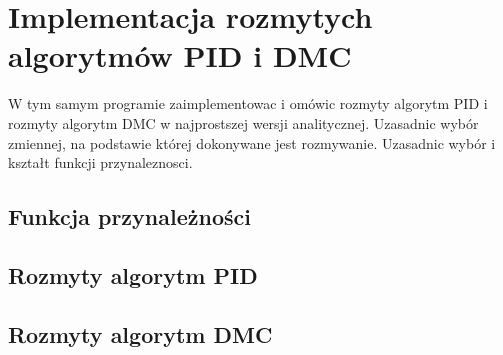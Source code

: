 \section{Implementacja rozmytych algorytmów PID i DMC}
\label{projekt:zad5}


W tym samym programie zaimplementowac i omówic rozmyty algorytm PID i rozmyty
algorytm DMC w najprostszej wersji analitycznej. Uzasadnic wybór zmiennej,
na podstawie której dokonywane jest rozmywanie. Uzasadnic wybór i kształt funkcji
przynaleznosci.

%    


\subsection{Funkcja przynależności}
\label{projekt:zad5:fuzzyFunction}



\newpage

\subsection{Rozmyty algorytm PID}
\label{projekt:zad5:PID}



\newpage

\subsection{Rozmyty algorytm DMC}
\label{projekt:zad5:DMC}



\newpage
